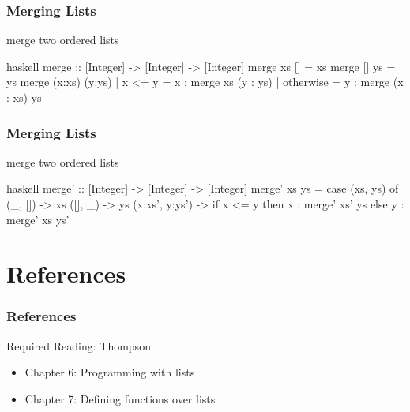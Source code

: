 \documentclass[dvipsnames]{beamer}
\theoremstyle{plain}
\begin{document}
\begin{frame}[fragile]
  \frametitle{Merging Lists}

  \begin{exampleblock}{merge two ordered lists}
    \begin{pygments}{haskell}
merge :: [Integer] -> [Integer] -> [Integer]
merge xs [] = xs
merge [] ys = ys
merge (x:xs) (y:ys)
  | x <= y    = x : merge xs (y : ys)
  | otherwise = y : merge (x : xs) ys
    \end{pygments}
  \end{exampleblock}
\end{frame}

\begin{frame}[fragile]
  \frametitle{Merging Lists}

  \begin{exampleblock}{merge two ordered lists}
    \begin{pygments}{haskell}
merge' :: [Integer] -> [Integer] -> [Integer]
merge' xs ys =
    case (xs, ys) of
      (_, [])        -> xs
      ([], _)        -> ys
      (x:xs', y:ys') -> if x <= y
                            then x : merge' xs' ys
                            else y : merge' xs ys'
    \end{pygments}
  \end{exampleblock}
\end{frame}

\section*{References}

\begin{frame}
  \frametitle{References}

  \begin{block}{Required Reading: Thompson}
    \begin{itemize}
      \item Chapter 6: \alert{Programming with lists}
      \item Chapter 7: \alert{Defining functions over lists}
    \end{itemize}
  \end{block}
\end{frame}
\end{document}
